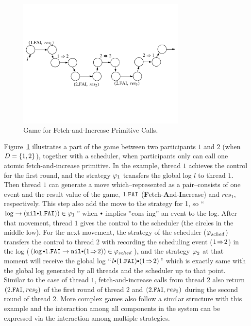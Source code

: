 \begin{figure}
\begin{center}
\includegraphics[width=0.75\textwidth]{figs/ccal/faiexample}
\end{center}%
\caption{Game for Fetch-and-Increase Primitive Calls.}
\label{fig:chapter:ccal:game-for-fetch-and-increase-primitive-call}
\end{figure}

Figure~\ref{fig:chapter:ccal:game-for-fetch-and-increase-primitive-call} illustrates 
a part of the game between two participants $1$ and $2$ (when $D = \{1, 2\}$), together with a scheduler,
when participants only can call one atomic fetch-and-increase primitive.
In the example, thread $1$ achieves the control for the first round,
and the strategy  $\varphi_{1}$ transfers the global log $l$  to thread $1$. 
Then thread $1$ can generate a move which--represented as a pair--consists of one event and the result value of the game,
$1.{\mathrm{\texttt{FAI}}}$ (\textbf{F}etch-\textbf{A}nd-\textbf{I}ncrease) and $res_1$, respectively.
This step also add the move to  the strategy for 1, so ``$\log \rightarrow (\nulllist \cons 1.\incticket)) \in \strat{1}$'' when 
$\cons$ implies ''cons-ing'' an event to the log.
After that movement,  thread $1$ gives the control to the scheduler (the circles in the middle low).
For the next movement, the strategy of the scheduler  ($\varphi_{sched}$)  transfers the control 
to thread 2 with recording the scheduling event ($1 \!\Rightarrow\! 2$) in the log ($(\log \cons 1.\incticket \rightarrow \nulllist \cons (1 \switch 2)) \in \strat{sched}$),
and the strategy  $\varphi_{2}$ at that moment will receive the global log ``$l \cons (1.\incticket) \cons (1 \switch 2)$''
which is exactly same with the global log generated by all threads and the scheduler up to that point.
Similar to the case of thread $1$, fetch-and-increase calls from thread 2 also return $(2.{\mathrm{\texttt{FAI}}}, res_2)$ of the first round of thread $2$
and $(2.{\mathrm{\texttt{FAI}}}, res_3)$ during the second round of thread $2$.
More complex games also follow a similar structure with this example and the interaction among all components in the system 
can be expressed via the interaction among multiple strategies.

